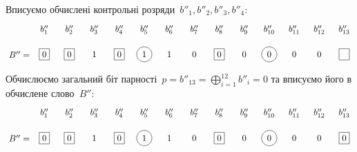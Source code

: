 \documentclass[
	a4paper,
	oneside,
	BCOR = 10mm,
	DIV = 12,
	12pt,
	headings = normal,
]{scrartcl}
\begin{document}
			Вписуємо обчислені контрольні розряди~$b''_1, b''_2, b''_3, b''_4$:
			\[
				\begin{tikzpicture}
					\node[] (B-dbl-prime) at (0,0) {$B'' = $};
					\node[draw, right of = B-dbl-prime] (b01) {0};
					\node[draw, right of = b01] (b02) {0};
					\node[right of = b02] (b03) {1};
					\node[draw, right of = b03] (b04) {0};
					\node[draw, circle, right of = b04] (b05) {1};
					\node[right of = b05] (b06) {1};
					\node[right of = b06] (b07) {0};
					\node[draw, right of = b07] (b08) {0};
					\node[right of = b08] (b09) {0};
					\node[draw, circle, right of = b09] (b10) {0};
					\node[right of = b10] (b11) {0};
					\node[right of = b11] (b12) {0};
					\node[draw, right of = b12] (b13) {\phantom{1}};

					\node[above of = b01] (b01_t) {$b''_{1}$};
					\node[above of = b02] (b02_t) {$b''_{2}$};
					\node[above of = b03] (b03_t) {$b''_{3}$};
					\node[above of = b04] (b04_t) {$b''_{4}$};
					\node[above of = b05] (b05_t) {$b''_{5}$};
					\node[above of = b06] (b06_t) {$b''_{6}$};
					\node[above of = b07] (b07_t) {$b''_{7}$};
					\node[above of = b08] (b08_t) {$b''_{8}$};
					\node[above of = b09] (b09_t) {$b''_{9}$};
					\node[above of = b10] (b10_t) {$b''_{10}$};
					\node[above of = b11] (b11_t) {$b''_{11}$};
					\node[above of = b12] (b12_t) {$b''_{12}$};
					\node[above of = b13] (b13_t) {$b''_{13}$};
				\end{tikzpicture}
			\]

			Обчислюємо загальний біт парності~$p = b''_{13}= \bigoplus_{i = 1}^{12} b''_i = 0$ та вписуємо його в обчислене слово~$B''$:
			\[
				\begin{tikzpicture}
					\node[] (B-dbl-prime) at (0,0) {$B'' = $};
					\node[draw, right of = B-dbl-prime] (b01) {0};
					\node[draw, right of = b01] (b02) {0};
					\node[right of = b02] (b03) {1};
					\node[draw, right of = b03] (b04) {0};
					\node[draw, circle, right of = b04] (b05) {1};
					\node[right of = b05] (b06) {1};
					\node[right of = b06] (b07) {0};
					\node[draw, right of = b07] (b08) {0};
					\node[right of = b08] (b09) {0};
					\node[draw, circle, right of = b09] (b10) {0};
					\node[right of = b10] (b11) {0};
					\node[right of = b11] (b12) {0};
					\node[draw, right of = b12] (b13) {0};

					\node[above of = b01] (b01_t) {$b''_{1}$};
					\node[above of = b02] (b02_t) {$b''_{2}$};
					\node[above of = b03] (b03_t) {$b''_{3}$};
					\node[above of = b04] (b04_t) {$b''_{4}$};
					\node[above of = b05] (b05_t) {$b''_{5}$};
					\node[above of = b06] (b06_t) {$b''_{6}$};
					\node[above of = b07] (b07_t) {$b''_{7}$};
					\node[above of = b08] (b08_t) {$b''_{8}$};
					\node[above of = b09] (b09_t) {$b''_{9}$};
					\node[above of = b10] (b10_t) {$b''_{10}$};
					\node[above of = b11] (b11_t) {$b''_{11}$};
					\node[above of = b12] (b12_t) {$b''_{12}$};
					\node[above of = b13] (b13_t) {$b''_{13}$};
				\end{tikzpicture}
			\]
\end{document}
